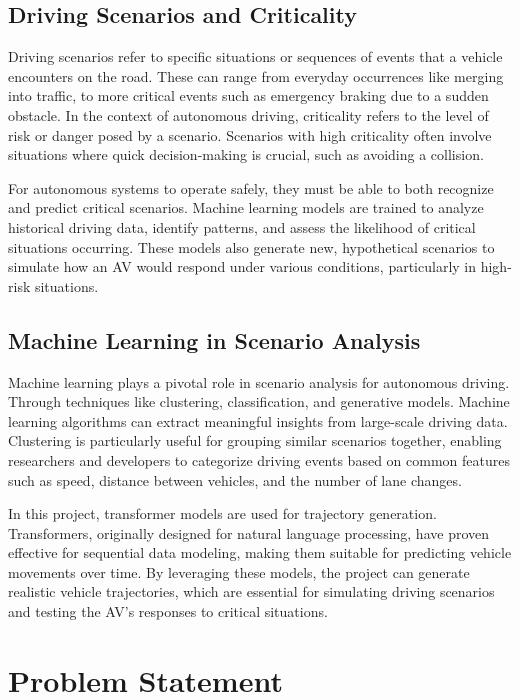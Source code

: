 \documentclass[12pt,a4paper]{report}
\begin{document}
\subsection{Driving Scenarios and Criticality}

Driving scenarios refer to specific situations or sequences of events that a vehicle encounters on the road. These can range from everyday occurrences like merging into traffic, to more critical events such as emergency braking due to a sudden obstacle. In the context of autonomous driving, criticality refers to the level of risk or danger posed by a scenario. Scenarios with high criticality often involve situations where quick decision-making is crucial, such as avoiding a collision.

For autonomous systems to operate safely, they must be able to both recognize and predict critical scenarios. Machine learning models are trained to analyze historical driving data, identify patterns, and assess the likelihood of critical situations occurring. These models also generate new, hypothetical scenarios to simulate how an AV would respond under various conditions, particularly in high-risk situations.


\subsection{Machine Learning in Scenario Analysis}

Machine learning plays a pivotal role in scenario analysis for autonomous driving. Through techniques like clustering, classification, and generative models. Machine learning algorithms can extract meaningful insights from large-scale driving data. Clustering is particularly useful for grouping similar scenarios together, enabling researchers and developers to categorize driving events based on common features such as speed, distance between vehicles, and the number of lane changes.

In this project, transformer models are used for trajectory generation. Transformers, originally designed for natural language processing, have proven effective for sequential data modeling, making them suitable for predicting vehicle movements over time. By leveraging these models, the project can generate realistic vehicle trajectories, which are essential for simulating driving scenarios and testing the AV's responses to critical situations.

\section{Problem Statement}
\end{document}
